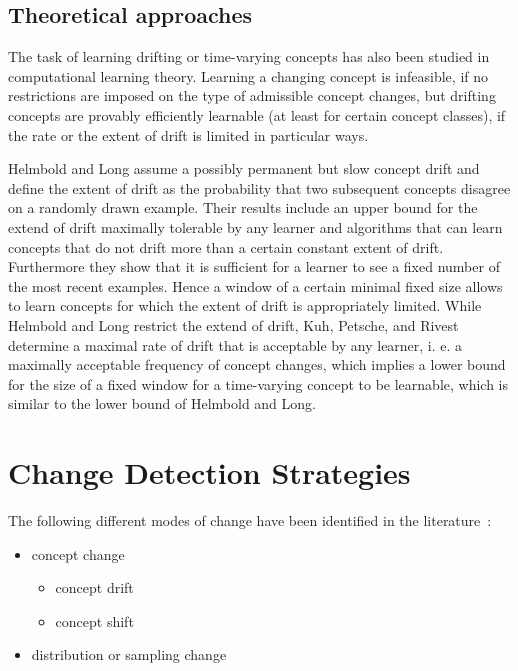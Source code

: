 \subsection{Theoretical approaches}%

The task of learning drifting or time-varying concepts has also been studied
 in computational learning theory. Learning a changing concept is infeasible,
 if no restrictions are imposed on the type of admissible concept changes,  
but drifting concepts are provably efficiently learnable (at least for certain 
concept classes), if the rate or the extent of drift is limited in particular ways. 

Helmbold and Long \cite{helmbold94tracking} assume a possibly permanent but slow concept 
drift and define the extent of drift as the probability that two subsequent 
concepts disagree on a randomly drawn example. Their results include an 
upper bound for the extend of drift maximally tolerable by any learner and 
algorithms that can learn concepts that do not drift more than a certain 
constant extent of drift. Furthermore they show that it is sufficient for a 
learner to see a fixed number of the most recent examples. Hence a window 
of a certain minimal fixed size allows to learn concepts for which the extent 
of drift is appropriately limited. 
While Helmbold and Long restrict the extend of drift, Kuh, Petsche, and 
Rivest~\cite{kuh} determine a maximal rate of drift that is acceptable by any learner, 
i. e. a maximally acceptable frequency of concept changes, which implies a 
lower bound for the size of a fixed window for a time-varying concept to be 
learnable, which is similar to the lower bound of Helmbold and Long. 

\ENDOMIT

\section{Change Detection Strategies} 

The following different modes of change have been identified in the literature~\cite{tsymbal-problem,stanley03learning,WidmerKubat}:

\begin{itemize}
\item concept change
\begin{itemize}
\item concept drift
\item concept shift
\end{itemize}
\item distribution or sampling change
\end{itemize}

